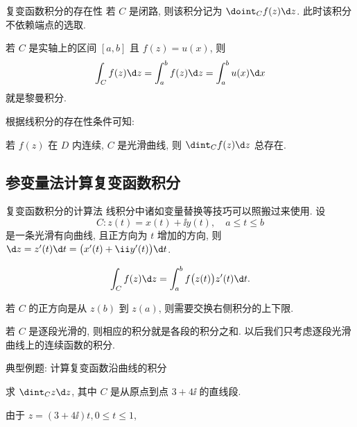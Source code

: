 \begin{frame}{复变函数积分的存在性}
	\onslide<+->
	若 $C$ 是闭路, 则该积分记为 \alert{$\doint_Cf(z)\d z$}.
	\onslide<+->
	此时该积分不依赖端点的选取.

	\onslide<+->
	若 $C$ 是实轴上的区间 $[a,b]$ 且 $f(z)=u(x)$, 
	\onslide<+->
	则
	\[
		\int_Cf(z)\d z=\int_a^bf(z)\d z=\int_a^b u(x)\d x
	\]
	就是黎曼积分.

	\onslide<+->
	根据线积分的存在性条件可知:
	\onslide<+->
	\begin{theorem}
		若 $f(z)$ 在 $D$ 内连续, $C$ 是光滑曲线, 则 $\dint_Cf(z)\d z$ 总存在.
	\end{theorem}
\end{frame}


\subsection{参变量法计算复变函数积分}

\begin{frame}{复变函数积分的计算法}
	\onslide<+->
	线积分中诸如变量替换等技巧可以照搬过来使用.
	\onslide<+->
	设
	\[
		C:z(t)=x(t)+\ii y(t),\quad a\le t\le b
	\]
	是一条光滑有向曲线, 且正方向为 $t$ 增加的方向,
	\onslide<+->
	则 $\d z=z'(t)\d t=\bigl(x'(t)+\ii y'(t)\bigr)\d t$.
	\onslide<+->
	\begin{theorem*}
		\[
			\int_Cf(z)\d z=\int_a^b f\bigl(z(t)\bigr)z'(t)\d t.
		\]
	\end{theorem*}
	\onslide<+->
	若 $C$ 的正方向是从 $z(b)$ 到 $z(a)$, 则需要交换右侧积分的上下限.

	\onslide<+->
	若 $C$ 是逐段光滑的, 则相应的积分就是各段的积分之和.
	\onslide<+->
	以后我们\alert{只考虑逐段光滑曲线上的连续函数的积分}.
\end{frame}


\begin{frame}{典型例题: 计算复变函数沿曲线的积分}
	\onslide<+->
	\begin{example}[nearnext]
		求 $\dint_Cz\d z$, 其中 $C$ 是从原点到点 $3+4\ii$ 的直线段.
	\end{example}
	\onslide<+->
	\begin{solution}[nearprev,sidepic,righthand width=113pt]
		由于 $z=(3+4\ii)t,0\le t\le 1$,
		\bigdel
		\tcblower
	\end{solution}
\end{frame}


